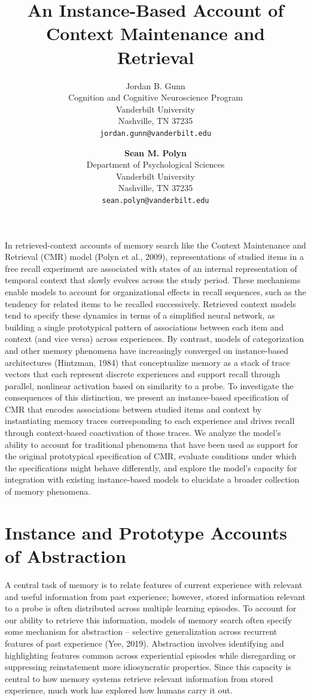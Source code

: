 \documentclass[
  letterpaper,
  DIV=11]{article}
\title{An Instance-Based Account of Context Maintenance and Retrieval}
\author{Jordan B. Gunn\\
Cognition and Cognitive Neuroscience Program\\
Vanderbilt University\\
Nashville, TN 37235\\
\texttt{jordan.gunn@vanderbilt.edu} \and \textbf{Sean M. Polyn}\\
Department of Psychological Sciences\\
Vanderbilt University\\
Nashville, TN 37235\\
\texttt{sean.polyn@vanderbilt.edu}}
\date{}
\begin{document}
\maketitle

In retrieved-context accounts of memory search like the Context
Maintenance and Retrieval (CMR) model (Polyn et al., 2009),
representations of studied items in a free recall experiment are
associated with states of an internal representation of temporal context
that slowly evolves across the study period. These mechanisms enable
models to account for organizational effects in recall sequences, such
as the tendency for related items to be recalled successively. Retrieved
context models tend to specify these dynamics in terms of a simplified
neural network, as building a single prototypical pattern of
associations between each item and context (and vice versa) across
experiences. By contrast, models of categorization and other memory
phenomena have increasingly converged on instance-based architectures
(Hintzman, 1984) that conceptualize memory as a stack of trace vectors
that each represent discrete experiences and support recall through
parallel, nonlinear activation based on similarity to a probe. To
investigate the consequences of this distinction, we present an
instance-based specification of CMR that encodes associations between
studied items and context by instantiating memory traces corresponding
to each experience and drives recall through context-based coactivation
of those traces. We analyze the model's ability to account for
traditional phenomena that have been used as support for the original
prototypical specification of CMR, evaluate conditions under which the
specifications might behave differently, and explore the model's
capacity for integration with existing instance-based models to
elucidate a broader collection of memory phenomena.

\hypertarget{instance-and-prototype-accounts-of-abstraction}{%
\section{Instance and Prototype Accounts of
Abstraction}\label{instance-and-prototype-accounts-of-abstraction}}

A central task of memory is to relate features of current experience
with relevant and useful information from past experience; however,
stored information relevant to a probe is often distributed across
multiple learning episodes. To account for our ability to retrieve this
information, models of memory search often specify some mechanism for
abstraction -- selective generalization across recurrent features of
past experience (Yee, 2019). Abstraction involves identifying and
highlighting features common across experiential episodes while
disregarding or suppressing reinstatement more idiosyncratic properties.
Since this capacity is central to how memory systems retrieve relevant
information from stored experience, much work has explored how humans
carry it out.
\end{document}
